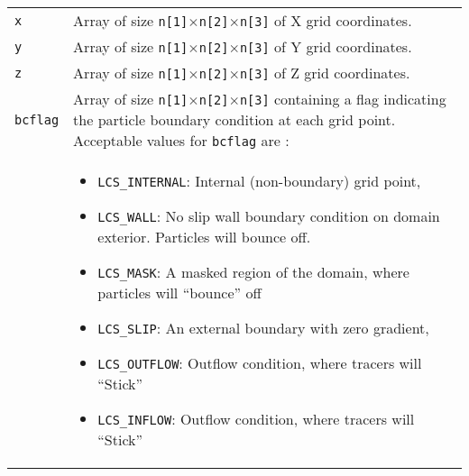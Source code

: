 \documentclass[letterpaper,11pt]{article}
\begin{document}
\begin{longtable}{lp{}}
\verb|x|& Array of size \verb|n[1]|$\times$\verb|n[2]|$\times$\verb|n[3]| of X grid coordinates.\\
\verb|y|& Array of size \verb|n[1]|$\times$\verb|n[2]|$\times$\verb|n[3]| of Y grid coordinates.\\
\verb|z|& Array of size \verb|n[1]|$\times$\verb|n[2]|$\times$\verb|n[3]| of Z grid coordinates.\\
\verb|bcflag|& Array of size \verb|n[1]|$\times$\verb|n[2]|$\times$\verb|n[3]| containing a flag indicating the particle boundary condition at each grid point.  Acceptable values for \verb|bcflag| are :\\
&\begin{itemize}
  \item \verb|LCS_INTERNAL|:  Internal (non-boundary) grid point,
  \item \verb|LCS_WALL|:  No slip wall boundary condition on domain exterior. Particles will bounce off.
  \item \verb|LCS_MASK|: A masked region of the domain, where particles will ``bounce'' off
  \item \verb|LCS_SLIP|: An external boundary with zero gradient, 
  \item \verb|LCS_OUTFLOW|: Outflow condition, where tracers will ``Stick''
  \item \verb|LCS_INFLOW|: Outflow condition, where tracers will ``Stick''
 \end{itemize}\\
 \hline
\end{longtable}
\end{document}
